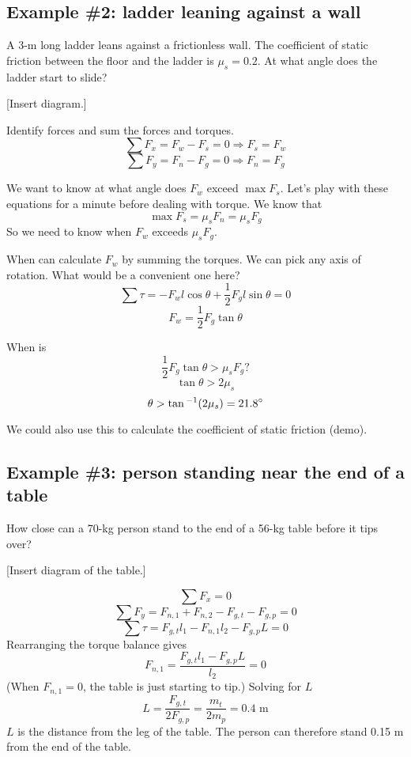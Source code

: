 \subsection{Example \#2: ladder leaning against a wall}
A 3-m long ladder leans against a frictionless wall. The coefficient of static friction between the floor and the ladder is $\mu_s=0.2$. At what angle does the ladder start to slide?

[Insert diagram.]
\vspace{5cm}

Identify forces and sum the forces and torques.
$$\sum F_x = F_w-F_s=0 \Rightarrow F_s=F_w$$
$$\sum F_y = F_n - F_g=0 \Rightarrow F_n=F_g$$

We want to know at what angle does $F_w$ exceed $\max F_s$. Let's play with these equations for a minute before dealing with torque. We know that
$$\max F_s=\mu_sF_n=\mu_sF_g$$
So we need to know when $F_w$ exceeds $\mu_sF_g$.

When can calculate $F_w$ by summing the torques. We can pick any axis of rotation. What would be a convenient one here?
$$\sum \tau=-F_wl\cos\theta+\frac{1}{2}F_gl\sin\theta=0$$
$$F_w=\frac{1}{2}F_g\tan\theta$$

When is
$$\frac{1}{2}F_g\tan\theta > \mu_s F_g?$$
$$\tan\theta > 2\mu_s$$
$$\theta > \tan\displaystyle^{-1}(2\mu_s)=21.8^\circ$$

We could also use this to calculate the coefficient of static friction (demo).




\subsection{Example \#3: person standing near the end of a table}
How close can a 70-kg person stand to the end of a 56-kg table before it tips over?

[Insert diagram of the table.]

$$\sum F_x = 0$$
$$\sum F_y = F_{n,1}+F_{n,2}-F_{g,t}-F_{g,p}=0$$
$$\sum \tau = F_{g,t}l_1-F_{n,1}l_2-F_{g,p}L=0$$
Rearranging the torque balance gives
$$F_{n,1}=\frac{F_{g,t}l_1-F_{g,p}L}{l_2}=0$$
(When $F_{n,1}=0$, the table is just starting to tip.) Solving for $L$
$$L=\frac{F_{g,t}}{2F_{g,p}}=\frac{m_t}{2m_p}=0.4\mbox{ m}$$
$L$ is the distance from the leg of the table. The person can therefore stand 0.15 m from the end of the table.



\clearpage
